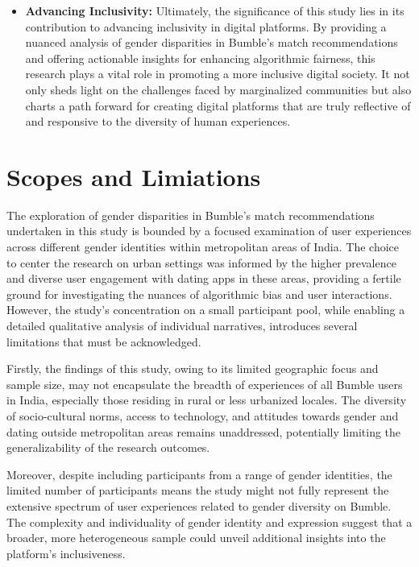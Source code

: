 \begin{itemize}
    \item \textbf{Advancing Inclusivity:} Ultimately, the significance of this study lies in its contribution to advancing inclusivity in digital platforms. By providing a nuanced analysis of gender disparities in Bumble’s match recommendations and offering actionable insights for enhancing algorithmic fairness, this research plays a vital role in promoting a more inclusive digital society. It not only sheds light on the challenges faced by marginalized communities but also charts a path forward for creating digital platforms that are truly reflective of and responsive to the diversity of human experiences.
\end{itemize} 

\section{Scopes and Limiations}
The exploration of gender disparities in Bumble’s match recommendations undertaken in this study is bounded by a focused examination of user experiences across different gender identities within metropolitan areas of India. The choice to center the research on urban settings was informed by the higher prevalence and diverse user engagement with dating apps in these areas, providing a fertile ground for investigating the nuances of algorithmic bias and user interactions. However, the study’s concentration on a small participant pool, while enabling a detailed qualitative analysis of individual narratives, introduces several limitations that must be acknowledged.

Firstly, the findings of this study, owing to its limited geographic focus and sample size, may not encapsulate the breadth of experiences of all Bumble users in India, especially those residing in rural or less urbanized locales. The diversity of socio-cultural norms, access to technology, and attitudes towards gender and dating outside metropolitan areas remains unaddressed, potentially limiting the generalizability of the research outcomes.

Moreover, despite including participants from a range of gender identities, the limited number of participants means the study might not fully represent the extensive spectrum of user experiences related to gender diversity on Bumble. The complexity and individuality of gender identity and expression suggest that a broader, more heterogeneous sample could unveil additional insights into the platform’s inclusiveness.


